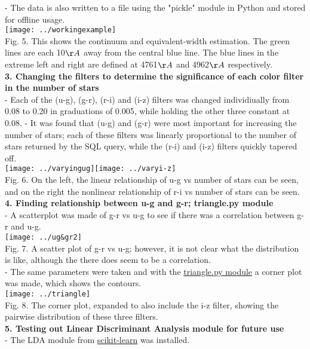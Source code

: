 \documentclass[12pt]{article}
\begin{document}
- The data is also written to a file using the "pickle" module in Python and stored for offline usage. \\
\texttt{[image: ../workingexample]}\\
Fig. 5. This shows the continuum and equivalent-width estimation. The green lines are each 10$\AA$  away from the central blue line. The blue lines in the extreme left and right are defined at 4761$\AA$ and 4962$\AA$  respectively. \\
\textbf{3. Changing the filters to determine the significance of each color filter in the number of stars	}\\
- Each of the (u-g), (g-r), (r-i) and (i-z) filters was changed individiually from 0.08 to 0.20 in graduations of 0.005, while holding the other three constant at 0.08. 
- It was found that (u-g) and (g-r) were most important for increasing the number of stars; each of these filters was linearly proportional to the number of stars returned by the SQL query, while the (r-i) and (i-z) filters quickly tapered off. \\
\texttt{[image: ../varyingug]}\texttt{[image: ../varyi-z]}\\
Fig. 6. On the left, the linear relationship of u-g vs number of stars can be seen, and on the right the nonlinear relationship of r-i vs number of stars can be seen.\\
\textbf{4. Finding relationship between u-g and g-r; triangle.py module}\\
- A scatterplot was made of g-r vs u-g to see if there was a correlation between g-r and u-g. \\
\texttt{[image: ../ug\&gr2]}\\
Fig. 7. A scatter plot of g-r vs u-g; however, it is not clear what the distribution is like, although the there does seem to be a correlation.\\
- The same parameters were taken and with the \href{https://github.com/dfm/triangle.py}{triangle.py module} a corner plot was made, which shows the contours.\\
\texttt{[image: ../triangle]}\\
Fig. 8. The corner plot, expanded to also include the i-z filter, showing the pairwise distribution of these three filters.\\
\textbf{5. Testing out Linear Discriminant Analysis module for future use}\\
- The LDA module from \href{http://scikit-learn.org/stable/install.html}{scikit-learn} was installed.
\end{document}

